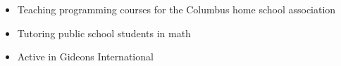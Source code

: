 \documentclass[margin, 10pt]{res} %
\begin{document}
\begin{resume}
\begin{itemize}
\item Teaching programming courses for the Columbus home school association
\item Tutoring public school students in math
\item Active in Gideons International
\end{itemize}


%
%
%
%
%
%
%
%
%
%
\end{resume}
\end{document}
